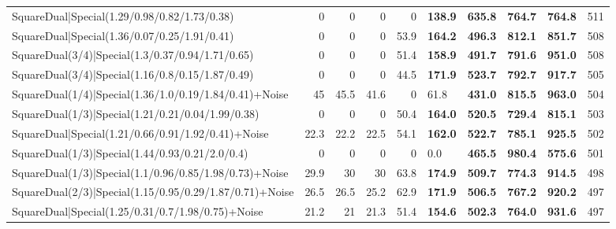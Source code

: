 \begin{tabular}{lrrrrllllr}
 SquareDual|Special(1.29/0.98/0.82/1.73/0.38)            &          0   &          0   &          0   &             0   & \textbf{138.9} & \textbf{635.8} & \textbf{764.7} & \textbf{764.8}  &          511 \\
 SquareDual|Special(1.36/0.07/0.25/1.91/0.41)            &          0   &          0   &          0   &            53.9 & \textbf{164.2} & \textbf{496.3} & \textbf{812.1} & \textbf{851.7}  &          508 \\
 SquareDual(3/4)|Special(1.3/0.37/0.94/1.71/0.65)        &          0   &          0   &          0   &            51.4 & \textbf{158.9} & \textbf{491.7} & \textbf{791.6} & \textbf{951.0}  &          508 \\
 SquareDual(3/4)|Special(1.16/0.8/0.15/1.87/0.49)        &          0   &          0   &          0   &            44.5 & \textbf{171.9} & \textbf{523.7} & \textbf{792.7} & \textbf{917.7}  &          505 \\
 SquareDual(1/4)|Special(1.36/1.0/0.19/1.84/0.41)+Noise  &         45   &         45.5 &         41.6 &             0   & 61.8           & \textbf{431.0} & \textbf{815.5} & \textbf{963.0}  &          504 \\
 SquareDual(1/3)|Special(1.21/0.21/0.04/1.99/0.38)       &          0   &          0   &          0   &            50.4 & \textbf{164.0} & \textbf{520.5} & \textbf{729.4} & \textbf{815.1}  &          503 \\
 SquareDual|Special(1.21/0.66/0.91/1.92/0.41)+Noise      &         22.3 &         22.2 &         22.5 &            54.1 & \textbf{162.0} & \textbf{522.7} & \textbf{785.1} & \textbf{925.5}  &          502 \\
 SquareDual(1/3)|Special(1.44/0.93/0.21/2.0/0.4)         &          0   &          0   &          0   &             0   & 0.0            & \textbf{465.5} & \textbf{980.4} & \textbf{575.6}  &          501 \\
 SquareDual(1/3)|Special(1.1/0.96/0.85/1.98/0.73)+Noise  &         29.9 &         30   &         30   &            63.8 & \textbf{174.9} & \textbf{509.7} & \textbf{774.3} & \textbf{914.5}  &          498 \\
 SquareDual(2/3)|Special(1.15/0.95/0.29/1.87/0.71)+Noise &         26.5 &         26.5 &         25.2 &            62.9 & \textbf{171.9} & \textbf{506.5} & \textbf{767.2} & \textbf{920.2}  &          497 \\
 SquareDual|Special(1.25/0.31/0.7/1.98/0.75)+Noise       &         21.2 &         21   &         21.3 &            51.4 & \textbf{154.6} & \textbf{502.3} & \textbf{764.0} & \textbf{931.6}  &          497 \\

\end{tabular}
